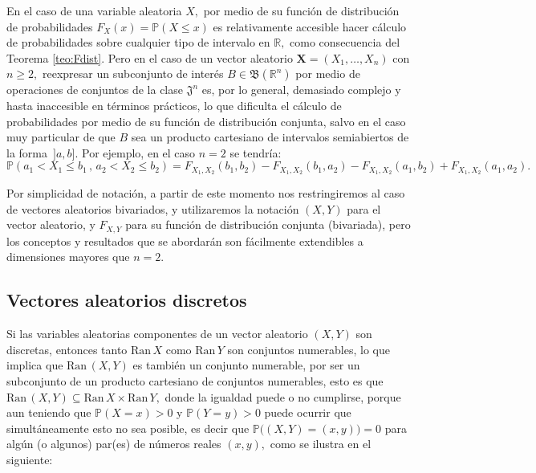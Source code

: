 \documentclass[spanish,10pt,letterpaper]{article}
\newcommand{\prob}{\mathbb{P}}
\newcommand{\Runo}{\mathbb{R}}
\begin{document}
En el caso de una variable aleatoria $X,$ por medio de su función de distribución de probabilidades $F_X(x)=\prob(X\leq x)$ es relativamente accesible hacer cálculo de probabilidades sobre cualquier tipo de intervalo en $\Runo,$ como consecuencia del Teorema \ref{teo:Fdist}. Pero en el caso de un vector aleatorio $\mathbf{X}=(X_1,\ldots,X_n)$ con $n\geq 2,$ reexpresar un subconjunto de interés $B\in\mathfrak{B}(\Runo^n)$ por medio de operaciones de conjuntos de la clase $\mathfrak{J}^n$ es, por lo general, demasiado complejo y hasta inaccesible en términos prácticos, lo que dificulta el cálculo de probabilidades por medio de su función de distribución conjunta, salvo en el caso muy particular de que $B$ sea un producto cartesiano de intervalos semiabiertos de la forma $\,]a,b].$ Por ejemplo, en el caso $n=2$ se tendría:
\begin{equation}\label{eq:probRectangulo}
    \prob(a_1<X_1\leq b_1\,,\,a_2<X_2\leq b_2) = F_{X_1,X_2}(b_1,b_2) - F_{X_1,X_2}(b_1,a_2) - F_{X_1,X_2}(a_1,b_2) + F_{X_1,X_2}(a_1,a_2).
\end{equation}

\bigskip 

Por simplicidad de notación, a partir de este momento nos restringiremos al caso de vectores aleatorios bivariados, y utilizaremos la notación $(X,Y)$ para el vector aleatorio, y $F_{X,Y}$ para su función de distribución conjunta (bivariada), pero los conceptos y resultados que se abordarán son fácilmente extendibles a dimensiones mayores que $n=2.$


\subsection{Vectores aleatorios discretos}

Si las variables aleatorias componentes de un vector aleatorio $(X,Y)$ son discretas, entonces tanto $\text{Ran}\,X$ como $\text{Ran}\,Y$ son conjuntos numerables, lo que implica que $\text{Ran}\,(X,Y)$ es también un conjunto numerable, por ser un subconjunto de un producto cartesiano de conjuntos numerables, esto es que $\text{Ran}\,(X,Y)\subseteq\text{Ran}\,X\times\text{Ran}\,Y,$ donde la igualdad puede o no cumplirse, porque aun teniendo que $\prob(X=x)>0$ y $\prob(Y=y)>0$ puede ocurrir que simultáneamente esto no sea posible, es decir que $\prob\big((X,Y)=(x,y)\big)=0$ para algún (o algunos) par(es) de números reales $(x,y),$ como se ilustra en el siguiente:

\bigskip
\end{document}
